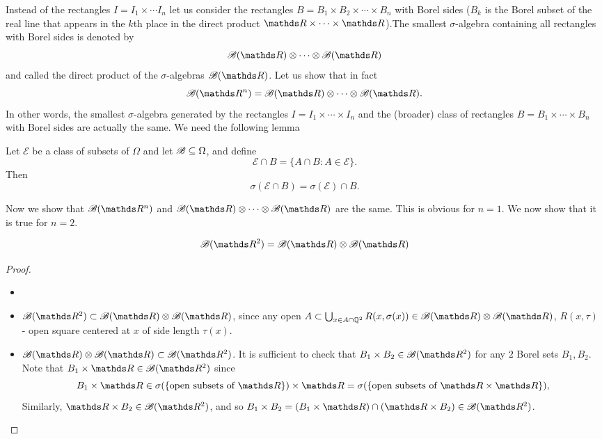Instead of the rectangles $I = I_1 \times \cdots I_n$ let us consider the rectangles $B = B_1 \times B_2 \times \cdots \times B_n$ with Borel sides ($B_k$ is the Borel subset of the real line that appears in the $k$th place in the direct product $\R \times \cdots \times \R$).The smallest $\sigma$-algebra containing all rectangles with Borel sides is denoted by
\begin{equation*}
    \B(\R) \otimes \cdots \otimes \B(\R)
\end{equation*}
and called the direct product of the $\sigma$-algebras $\B(\R)$. Let us show that in fact
\begin{equation*}
    \B(\R^n) = \B(\R) \otimes \cdots \otimes \B(\R).
\end{equation*}
In other words, the smallest $\sigma$-algebra generated by the rectangles $I = I_1 \times \cdots \times I_n$ and the (broader) class of rectangles $B = B_1 \times \cdots \times B_n$ with Borel sides are actually the same. We need the following lemma
\begin{lemma}
Let $\mathcal{E}$ be a class of subsets of $\Omega$ and let $\mathcal{B} \subseteq \Omega$, and define
\begin{equation*}
    \mathcal{E} \cap B = \{ A \cap B: A \in \mathcal{E}\}.
\end{equation*}
Then 
\begin{equation*}
    \sigma(\mathcal{E}\cap B) = \sigma(\mathcal{E})\cap B.
\end{equation*}
\end{lemma}
Now we show that $\B(\R^n)$ and $\B(\R) \otimes \cdots \otimes \B(\R)$ are the same. This is obvious for $n=1$. We now show that it is true for $n=2$.
\begin{lemma}
\begin{equation*}
    \B(\R^2) = \B(\R) \otimes \B(\R)
\end{equation*}
\end{lemma}
\begin{proof}
\begin{itemize}
    \item[]
    \item $\B(\R^2) \subset \B(\R) \otimes \B(\R)$, since any open $A \subset \bigcup_{x \in A\cap \mathbb{Q}^2} R(x, \sigma(x)) \in \B(\R) \otimes \B(\R)$, $R(x, \tau)$ - open square centered at $x$ of side length $\tau(x)$.
    \item $\B(\R) \otimes \B(\R) \subset \B(\R^2)$. It is sufficient to check that $B_1 \times B_2 \in \B(\R^2)$ for any $2$ Borel sets $B_1, B_2$. Note that $B_1 \times \R \in \B(\R^2)$ since 
    \begin{equation*}
        B_1 \times \R \in \sigma(\{ \text{open subsets of } \R \}) \times \R = \sigma (\{ \text{open subsets of }\R \times \R \}),
    \end{equation*}
    Similarly, $\R \times B_2 \in \B(\R^2)$, and so 
    $B_1 \times B_2 = (B_1 \times \R) \cap (\R \times B_2) \in \B(\R^2)$.
\end{itemize}
\end{proof}
